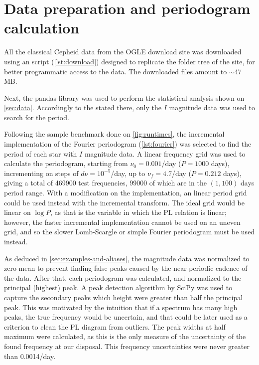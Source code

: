 
\section{Data preparation and periodogram calculation}

All the classical Cepheid data from the OGLE download site was downloaded using an script (\autoref{lst:download})
designed to replicate the folder tree of the site, for better programmatic access to the data.
The downloaded files amount to $\sim$47 MB.

Next, the pandas library \citep{pandas} was used to perform the statistical analysis shown on \autoref{sec:data}.
Accordingly to the stated there, only the $I$ magnitude data was used to search for the period.

Following the sample benchmark done on \autoref{fig:runtimes}, 
the incremental implementation of the Fourier periodogram (\autoref{lst:fourier}) was selected to find the period of each star with $I$ magnitude data.
A linear frequency grid was used to calculate the periodogram, starting from $\nu_0=0.001$/day ($P= 1000$ days), 
incrementing on steps of $d\nu = 10^{-5}$/day, up to $\nu_f=4.7$/day ($P=0.212$ days), giving a total of 469900 test frequencies, 
99000 of which are in the $(1,100)$ days period range.
With a modification on the implementation, an linear period grid could be used instead with the incremental transform.
The ideal grid would be linear on $\log P$, as that is the variable in which the PL relation is linear; 
however, the faster incremental implementation cannot be used on an uneven grid, and so the slower Lomb-Scargle or simple Fourier periodogram must be used instead.

As deduced in \autoref{sec:examples-and-aliases}, 
the magnitude data was normalized to zero mean to prevent finding false peaks caused by the near-periodic cadence of the data.
After that, each periodogram was calculated, and normalized to the principal (highest) peak.
A peak detection algorithm by SciPy \citep{scipy} was used to capture the secondary peaks which height were greater than half the principal peak.
This was motivated by the intuition that if a spectrum has many high peaks, 
the true frequency would be uncertain, and that could be later used as a criterion to clean the PL diagram from outliers.
The peak widths at half maximum were calculated, as this is the only measure of the uncertainty of the found frequency at our disposal.
This frequency uncertainties were never greater than 0.0014/day.

